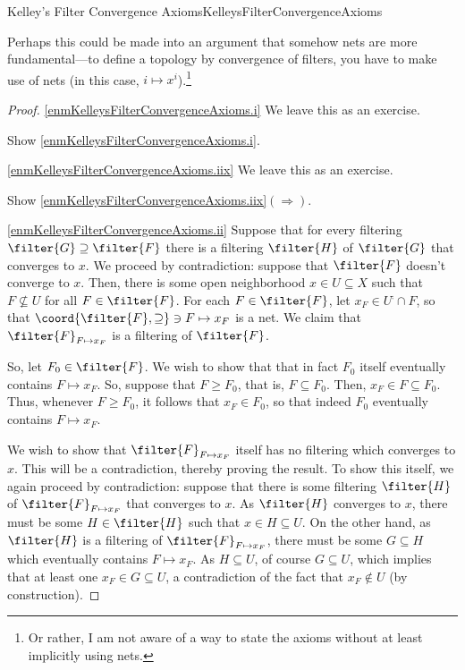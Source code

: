 \begin{prp}{Kelley's Filter Convergence Axioms}{KelleysFilterConvergenceAxioms}
\begin{rmk}
\end{rmk}
\begin{rmk}
Perhaps this could be made into an argument that somehow nets are more fundamental---to define a topology by convergence of filters, you have to make use of nets (in this case, $i\mapsto x^i$).\footnote{Or rather, I am not aware of a way to state the axioms without at least implicitly using nets.}
\end{rmk}
\begin{proof}
\cref{enmKelleysFilterConvergenceAxioms.i} We leave this as an exercise.
\begin{exr}[breakable=false]{}{}
Show \cref{enmKelleysFilterConvergenceAxioms.i}.
\end{exr}

\blankline
\noindent 
\cref{enmKelleysFilterConvergenceAxioms.iix} We leave this as an exercise.
\begin{exr}[breakable=false]{}{}
Show \cref{enmKelleysFilterConvergenceAxioms.iix}$(\Rightarrow )$.
\end{exr}

\blankline
\noindent
\cref{enmKelleysFilterConvergenceAxioms.ii} Suppose that for every filtering $\filter{G}\supseteq \filter{F}$ there is a filtering $\filter{H}$ of $\filter{G}$ that converges to $x$.  We proceed by contradiction:  suppose that $\filter{F}$ doesn't converge to $x$.  Then, there is some open neighborhood $x\in U\subseteq X$ such that $F\not\subseteq U$ for all $F\in \filter{F}$.  For each $F\in \filter{F}$, let $x_F\in U^{\comp}\cap F$, so that $\coord{\filter{F},\supseteq}\ni F\mapsto x_F$ is a net.  We claim that $\filter{F}_{F\mapsto x_F}$ is a filtering of $\filter{F}$.

So, let $F_0\in \filter{F}$.  We wish to show that that in fact $F_0$ itself eventually contains $F\mapsto x_F$.  So, suppose that $F\geq F_0$, that is, $F\subseteq F_0$.  Then, $x_F\in F\subseteq F_0$.  Thus, whenever $F\geq F_0$, it follows that $x_F\in F_0$, so that indeed $F_0$ eventually contains $F\mapsto x_F$.

We wish to show that $\filter{F}_{F\mapsto x_F}$ itself has no filtering which converges to $x$.  This will be a contradiction, thereby proving the result.  To show this itself, we again proceed by contradiction:  suppose that there is some filtering $\filter{H}$ of $\filter{F}_{F\mapsto x_F}$ that converges to $x$.  As $\filter{H}$ converges to $x$, there must be some $H\in \filter{H}$ such that $x\in H\subseteq U$.  On the other hand, as $\filter{H}$ is a filtering of $\filter{F}_{F\mapsto x_F}$, there must be some $G\subseteq H$ which eventually contains $F\mapsto x_F$.  As $H\subseteq U$, of course $G\subseteq U$, which implies that at least one $x_F\in G\subseteq U$, a contradiction of the fact that $x_F\notin U$ (by construction).


\end{proof}
\end{prp}
